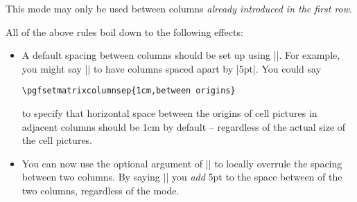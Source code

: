 \begin{command}{\pgfmatrixnextcell{}}
\begin{itemize}
            This mode may only be used between columns \emph{already introduced
            in the first row}.
    \end{itemize}
    All of the above rules boil down to the following effects:
    \begin{itemize}
        \item A default spacing between columns should be set up using
            |\pgfsetmatrixcolumnsep|. For example, you might say
            |\pgfsetmatrixcolumnsep{5pt}| to have columns spaced apart by
            |5pt|. You could say
\begin{verbatim}
\pgfsetmatrixcolumnsep{1cm,between origins}
\end{verbatim}
            to specify that horizontal space between the origins of cell
            pictures in adjacent columns should be 1cm by default -- regardless
            of the actual size of the cell pictures.
        \item You can now use the optional argument of |\pgfmatrixnextcell| to
            locally overrule the spacing between two columns. By saying
            |\pgfmatrixnextcell[5pt]| you \emph{add} 5pt to the space between
            of the two columns, regardless of the mode.


\end{itemize}
\end{command}

